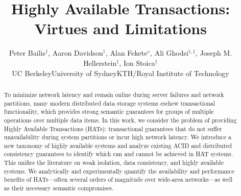 \documentclass{vldb}
\theoremstyle{definition}
\begin{document}

\title{Highly Available Transactions: Virtues and Limitations}
{\author{Peter Bailis{\fontsize{12}{14}$^\dagger$}, Aaron Davidson{\fontsize{12}{14}$^\dagger$}, Alan Fekete{\fontsize{12}{14}$^\diamond$}, Ali Ghodsi{\fontsize{12}{14}$^{\dagger,\ddagger}$}, Joseph M. Hellerstein{\fontsize{12}{14}$^\dagger$}, Ion Stoica{\fontsize{12}{14}$^\dagger$}\\{\affaddr{\fontsize{12}{14}$^\dagger$}\hspace{.5mm}UC Berkeley\hspace{4mm}{\fontsize{12}{14}$^\diamond$}\hspace{.5mm}University of Sydney\hspace{4mm}{\fontsize{12}{14}$^\ddagger$}\hspace{.5mm}KTH/Royal Institute of Technology}}}
\maketitle

\begin{abstract}
To minimize network latency and remain online during server failures
and network partitions, many modern distributed data storage systems
eschew transactional functionality, which provides strong semantic
guarantees for groups of multiple operations over multiple data
items. In this work, we consider the problem of providing Highly
Available Transactions (HATs): transactional guarantees that do not
suffer unavailability during system partitions or incur high network
latency.  We introduce a new taxonomy of highly available systems and
analyze existing ACID and distributed consistency guarantees to
identify which can and cannot be achieved in HAT systems. This unifies
the literature on weak isolation, data consistency, and highly
available systems. We analytically and experimentally quantify the
availability and performance benefits of HATs---often several orders
of magnitude over wide-area networks---as well as their necessary
semantic compromises.
\end{abstract}\vspace{-.5em}










\end{document}
